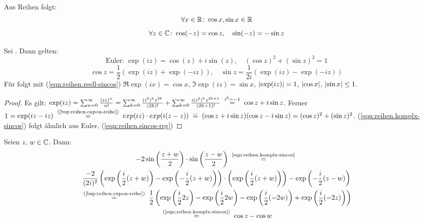 \documentclass[12pt]{scrreprt}
\begin{document}
\noindent Aus Reihen folgt:
\begin{equation}\label{eqn:reihen.reell-sincos}
\forall x\in\mathbb{R}\colon \cos x, \sin x \in\mathbb{R}
\end{equation}
\begin{equation}\label{eqn:reihen.sincos-reg}
\forall z\in\mathbb{C}\colon \cos(-z) = \cos z,\quad \sin(-z) = -\sin z
\end{equation}

\begin{satz}
Sei . Dann gelten:
\[\text{Euler: }\exp(iz) = \cos(z) + i\sin(z), \quad (\cos z)^2 + (\sin z)^2 = 1\] %
\begin{equation}\label{eqn:reihen....}
\cos z = \frac{1}{2}(\exp(iz) + \exp(-iz)),\quad \sin z = \frac{1}{2i}(\exp(iz) - \exp(-iz))
\end{equation}
Für  folgt mit (\ref{eqn:reihen.reell-sincos}) $\Re \exp(ix) = \cos x$, $\Im \exp(iz) = \sin x$, 
$\left\lvert\exp(iz)\right\lvert = 1$, $\left\lvert\cos x\right\lvert$, $\left\lvert\sin x\right\lvert \le 1$.
\end{satz}
\begin{proof}
Es gilt: $\exp(iz) = \sum_{n=0}^\infty \frac{(iz)^n}{n!} = \reihe{\frac{(i^2)^kz^{2k}}{(2k)!}} + \reihe{\frac{i(i^2)^kz^{2k+1}}{(2k+1)!}} \wegen{=}{i^2 = -1} \cos z + i\sin z$.
Ferner $1= \exp(iz - iz) \nach{=}{(\ref{bsp:reihen.expon-reihe})} exp(iz) \cdot exp(i(z-z)) \nach{=}{...} (\cos z + i\sin z)(\cos z - i\sin z) = (\cos z)^2 + (\sin z)^2$. 
(\ref{eqn:reihen.komplx-sincos}) folgt ähnlich aus Euler, (\ref{eqn:reihen.sincos-reg})
\end{proof}

\begin{kor}\label{kor:reihen....}
Seien $z$, $w\in\mathbb{C}$. Dann:
\begin{multline}
-2\sin\left(\frac{z+w}{2}\right)\cdot\sin\left(\frac{z-w}{2}\right) \nach{=}{\ref{eqn:reihen.komplx-sincos}} \\
\frac{-2}{(2i)^2}\left(\exp\left(\frac{i}{2}(z+w)\right)-\exp\left(-\frac{i}{2}(z+w)\right)\right)\cdot \left(\exp\left(\frac{i}{2}(z+w)\right)\right) - \exp\left(-\frac{i}{2}(z-w)\right)\\
\nach{=}{(\ref{bsp:reihen.expon-reihe})} \frac{1}{2}\left(\exp\left(\frac{i}{2} 2z\right)-\exp\left(\frac{i}{2}2w\right) - \exp\left(\frac{i}{2}(-2w)\right) + \exp\left(\frac{i}{2}(-2z)\right)\right)\\
\nach{=}{(\ref{eqn:reihen.komplx-sincos})} \cos z - \cos w
\end{multline}
\end{kor}
\end{document}
